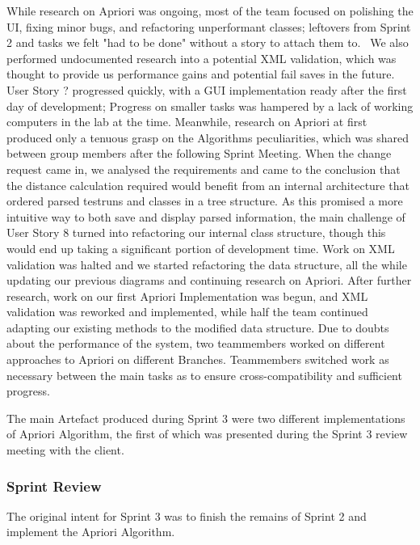 While research on Apriori was ongoing, most of the team focused on polishing the UI, fixing minor bugs, and refactoring unperformant classes; leftovers from Sprint 2 and tasks we felt "had to be done" without a story to attach them to. \ 
We also performed undocumented research into a potential XML validation, which was thought to provide us performance gains and potential fail saves in the future.
User Story ? progressed quickly, with a GUI implementation ready after the first day of development; Progress on smaller tasks was hampered by a lack of working computers in the lab at the time.
Meanwhile, research on Apriori at first produced only a tenuous grasp on the Algorithms peculiarities, which was shared between group members after the following Sprint Meeting. 
When the change request came in, we analysed the requirements and came to the conclusion that the distance calculation required would benefit from an internal architecture that ordered parsed testruns and classes in a tree structure. 
As this promised a more intuitive way to both save and display parsed information, the main challenge of User Story 8 turned into refactoring our internal class structure, though this would end up taking a significant portion of development time. 
Work on XML validation was halted and we started refactoring the data structure, all the while updating our previous diagrams and continuing research on Apriori.
After further research, work on our first Apriori Implementation was begun, and XML validation was reworked and implemented, while half the team continued adapting our existing methods to the modified data structure. Due to doubts about the performance of the system, two teammembers worked on different approaches to Apriori on different Branches. Teammembers switched work as necessary between the main tasks as to ensure cross-compatibility and sufficient progress. 

The main Artefact produced during Sprint 3 were two different implementations of Apriori Algorithm, the first of which was presented during the Sprint 3 review meeting with the client. 


\subsubsection*{Sprint Review}

The original intent for Sprint 3 was to finish the remains of Sprint 2 and implement the Apriori Algorithm. 

